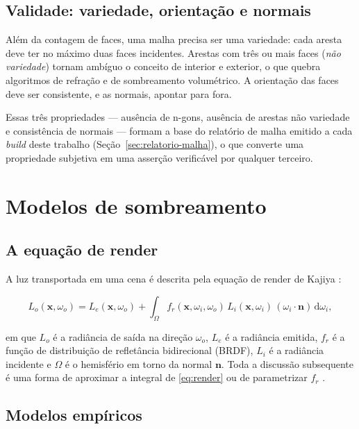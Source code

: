 \subsection{Validade: variedade, orienta\c{c}\~ao e normais}

Al\'em da contagem de faces, uma malha precisa ser uma variedade: cada aresta deve ter no
m\'aximo duas faces incidentes. Arestas com tr\^es ou mais faces (\emph{n\~ao variedade}) tornam
amb\'iguo o conceito de interior e exterior, o que quebra algoritmos de refra\c{c}\~ao e de
sombreamento volum\'etrico. A orienta\c{c}\~ao das faces deve ser consistente, e as normais,
apontar para fora.

Essas tr\^es propriedades --- aus\^encia de n-gons, aus\^encia de arestas n\~ao variedade e
consist\^encia de normais --- formam a base do relat\'orio de malha emitido a cada
\emph{build} deste trabalho (Se\c{c}\~ao~\ref{sec:relatorio-malha}), o que converte uma
propriedade subjetiva em uma asser\c{c}\~ao verific\'avel por qualquer terceiro.

\section{Modelos de sombreamento}

\subsection{A equa\c{c}\~ao de render}

A luz transportada em uma cena \'e descrita pela equa\c{c}\~ao de render de Kajiya
\cite{kajiya1986}:

\begin{equation}
L_o(\mathbf{x},\omega_o) = L_e(\mathbf{x},\omega_o) + \int_{\Omega} f_r(\mathbf{x},\omega_i,\omega_o)\,
L_i(\mathbf{x},\omega_i)\,(\omega_i \cdot \mathbf{n})\, \mathrm{d}\omega_i ,
\label{eq:render}
\end{equation}

\noindent em que $L_o$ \'e a radi\^ancia de sa\'ida na dire\c{c}\~ao $\omega_o$, $L_e$ \'e a
radi\^ancia emitida, $f_r$ \'e a fun\c{c}\~ao de distribui\c{c}\~ao de reflet\^ancia
bidirecional (BRDF), $L_i$ \'e a radi\^ancia incidente e $\Omega$ \'e o hemisf\'erio em torno da
normal $\mathbf{n}$. Toda a discuss\~ao subsequente \'e uma forma de aproximar a integral de
\eqref{eq:render} ou de parametrizar $f_r$ \cite{pharr2016}.

\subsection{Modelos emp\'iricos}

